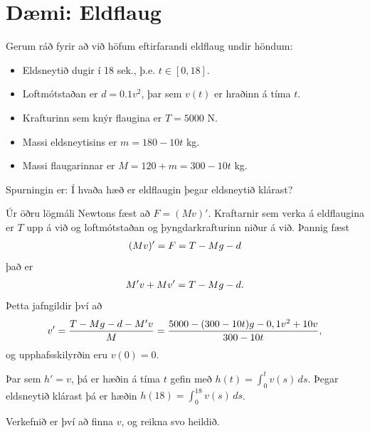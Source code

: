 \documentclass[letterpaper,10pt,icelandic]{sphinxmanual}
\begin{document}
\section{Dæmi: Eldflaug}
\label{kafli01:daemi-eldflaug}
Gerum ráð fyrir að við höfum eftirfarandi eldflaug undir höndum:
\begin{itemize}
\item {} 
Eldsneytið dugir í 18 sek., þ.e. \(t\in [0,18]\).

\item {} 
Loftmótstaðan er \(d=0.1v^2\), þar sem \(v(t)\) er hraðinn á tíma \(t\).

\item {} 
Krafturinn sem knýr flaugina er \(T=5000\) N.

\item {} 
Massi eldsneytisins er \(m=180-10t\) kg.

\item {} 
Massi flaugarinnar er \(M = 120 + m = 300 - 10t\) kg.

\end{itemize}

Spurningin er: Í hvaða hæð er eldflaugin þegar eldsneytið klárast?

Úr öðru lögmáli Newtons fæst að \(F = (Mv)'\). Kraftarnir sem verka
á eldflaugina er \(T\) upp á við og loftmótstaðan og
þyngdarkrafturinn niður á við. Þannig fæst
\begin{gather}
\begin{split}(Mv)' = F = T - Mg - d\end{split}\notag
\end{gather}
það er
\begin{gather}
\begin{split}M'v + Mv' = T - Mg -d.\end{split}\notag
\end{gather}
Þetta jafngildir því að
\label{kafli01:eldflaug}\begin{gather}
\begin{split}v' = \frac{T-Mg-d-M'v}{M} = \frac{5000-(300-10t)g-0,1v^2+10v}{300-10t},
\label{eldflaug}\end{split}\notag
\end{gather}
og upphafsskilyrðin eru \(v(0) =0\).

Þar sem \(h' = v\), þá er hæðin á tíma \(t\) gefin með
\(h(t) =\int_0^t v(s)\, ds\). Þegar eldsneytið klárast þá er hæðin
\(h(18) = \int_0^{18} v(s)\, ds\).

Verkefnið er því að finna \(v\), og reikna svo heildið.
\end{document}

